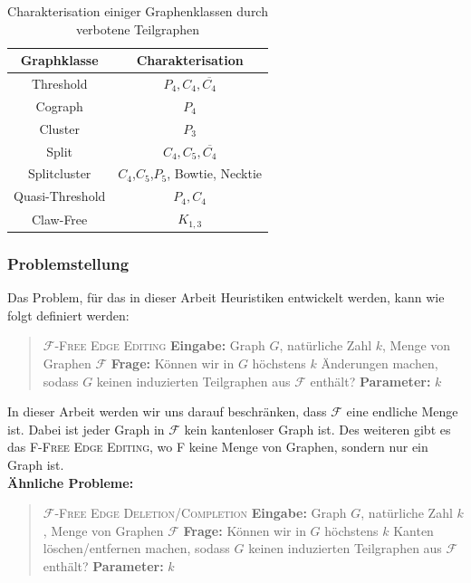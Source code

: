 \documentclass[12pt,a4paper,onecolumn,oneside,titlepage]{article}
\newcommand\cursive[1]{\ensuremath{\mathcal{#1}}}
\begin{document}
\begin{table}

\centering

\begin{tabular}{c c}
\textbf{Graphklasse} & \textbf{Charakterisation}\\ 
\hline 
Threshold & $P_4, C_4, \overline{C_4}$ \\
Cograph & $P_4$ \\
Cluster & $P_3$  \\
Split & $C_4, C_5, \overline{C_4}$ \\
Splitcluster & $C_4$,$C_5$,$P_5$, Bowtie, Necktie \\
Quasi-Threshold & $P_4,C_4$ \\
Claw-Free & $K_{1,3}$

\end{tabular} 
\caption{Charakterisation einiger Graphenklassen durch verbotene Teilgraphen}
\label{tab:graph_charac}
\end{table}


\subsubsection{Problemstellung}
\label{sec:problem}
Das Problem, für das in dieser Arbeit Heuristiken entwickelt werden, kann wie folgt definiert werden:
\begin{quote}
  \textsc{\cursive{F}-Free Edge Editing}\newline
  \textbf{Eingabe:} Graph $G$, natürliche Zahl $k$, Menge von Graphen \cursive{F}\newline
  \textbf{Frage:} Können wir in $G$ höchstens $k$ Änderungen machen, sodass $G$ keinen induzierten Teilgraphen aus \cursive{F} enthält?\newline
  \textbf{Parameter:} $k$
\end{quote}
In dieser Arbeit werden wir uns darauf beschränken, dass \cursive{F} eine endliche Menge ist. Dabei ist jeder Graph in \cursive{F} kein kantenloser Graph ist.
Des weiteren gibt es das \textsc{F-Free Edge Editing}, wo \textsc{F} keine Menge von Graphen, sondern nur ein Graph ist. \\


\textbf{Ähnliche Probleme:}

\begin{quote}
  \textsc{\cursive{F}-Free Edge Deletion/Completion}\newline
  \textbf{Eingabe:} Graph $G$, natürliche Zahl $k$, Menge von Graphen \cursive{F}\newline
  \textbf{Frage:} Können wir in $G$ höchstens $k$ Kanten löschen/entfernen  machen, sodass $G$ keinen induzierten Teilgraphen aus \cursive{F} enthält?\newline
  \textbf{Parameter:} $k$
\end{quote}
\end{document}
